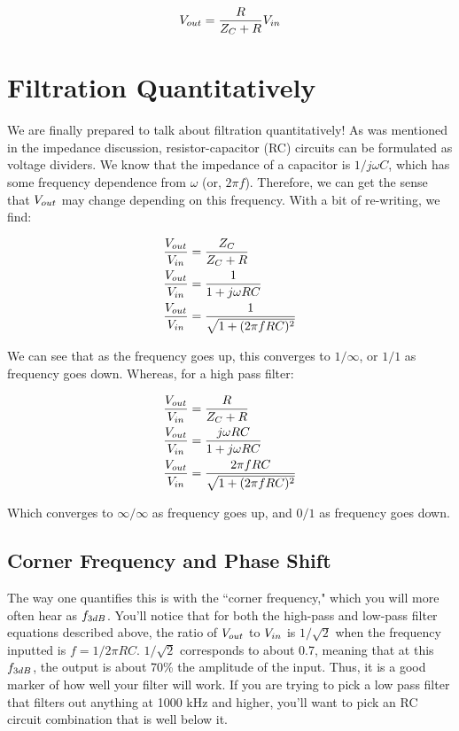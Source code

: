 \begin{equation} \label{imp5}
\begin{split}
{V}_{out} = \frac{R}{Z_C + R}{V}_{in}
\end{split}
\end{equation}

\section{Filtration Quantitatively}
We are finally prepared to talk about filtration quantitatively! As was mentioned in the impedance discussion, resistor-capacitor (RC) circuits can be formulated as voltage dividers. We know that the impedance of a capacitor is ${1} /{j\omega C}$, which has some frequency dependence from $\omega$ (or, $2\pi f$). Therefore, we can get the sense that ${V}_{out}$ may change depending on this frequency. With a bit of re-writing, we find: 

\begin{equation} \label{imp6}
\begin{split}
\frac{{V}_{out}}{{V}_{in}} &= \frac{Z_C}{Z_C + R} \\
\frac{{V}_{out}}{{V}_{in}} &= \frac{1}{1 + j\omega RC} \\
\frac{{V}_{out}}{{V}_{in}} &= \frac{1}{\sqrt{1 + (2\pi f RC)^2}} \\
\end{split}
\end{equation}

We can see that as the frequency goes up, this converges to $1 / \infty$, or $1/1$ as frequency goes down. Whereas, for a high pass filter: 

\begin{equation} \label{imp7}
\begin{split}
\frac{{V}_{out}}{{V}_{in}} &= \frac{R}{Z_C + R} \\
\frac{{V}_{out}}{{V}_{in}} &= \frac{j\omega RC}{1 + j\omega RC} \\
\frac{{V}_{out}}{{V}_{in}} &= \frac{2\pi f RC}{\sqrt{1 + (2\pi f RC)^2}} \\
\end{split}
\end{equation}

Which converges to $\infty / \infty$ as frequency goes up, and $0 / 1$ as frequency goes down.

\subsection{Corner Frequency and Phase Shift}
The way one quantifies this is with the ``corner frequency," which you will more often hear as ${f}_{3dB}$. You'll notice that for both the high-pass and low-pass filter equations described above, the ratio of ${V}_{out}$ to ${V}_{in}$ is $1/\sqrt{2}$ when the frequency inputted is $f = 1/2\pi RC$. $1/\sqrt{2}$ corresponds to about 0.7, meaning that at this ${f}_{3dB}$, the output is about 70\% the amplitude of the input. Thus, it is a good marker of how well your filter will work. If you are trying to pick a low pass filter that filters out anything at 1000 kHz and higher, you'll want to pick an RC circuit combination that is well below it.\newline

